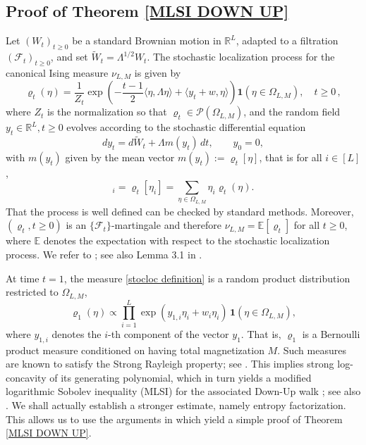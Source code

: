 \documentclass[11pt,reqno]{amsart}
\numberwithin{equation}{section}
\numberwithin{figure}{section}
\renewcommand{\geq}{\ge} %
\newcommand{\1}{\mathds{1}}
\let\O=\Omega
\let\L=\Lambda
\newcommand{\cF}{\ensuremath{\mathcal F}}
\newcommand{\cP}{\ensuremath{\mathcal P}}
\newcommand{\bbE}{{\ensuremath{\mathbb E}} }
\newcommand{\bbR}{{\ensuremath{\mathbb R}} }
\begin{document}
\subsection{Proof of Theorem \ref{MLSI DOWN UP}}
Let \((W_t)_{t \geq 0}\) be a standard Brownian motion in $\bbR^L$,  adapted to a filtration \((\mathcal{F}_t)_{t \geq 0}\), and set $\tilde W_t = \L^{1/2}W_t$. The stochastic localization process for the canonical Ising measure $\nu_{L,M}$ is given by 
\begin{equation}\label{stocloc definition}
    \varrho_t(\eta) =\frac1{Z_t} \exp\left( -\frac{t - 1}{2} \langle \eta, \Lambda \eta \rangle + \langle y_t + w, \eta \rangle \right) \mathbf{1}(\eta \in \Omega_{L,M}),\quad t\ge 0\,,
\end{equation}
where $Z_t$ is the normalization so that $\varrho_t\in\cP(\O_{L,M})$, and  the random field \(y_t \in \mathbb{R}^L, t\ge 0\) evolves according to the stochastic differential equation
\begin{equation}\label{SDE yt}
    dy_t =d\tilde W_t +  \Lambda m(y_t)\,dt, \qquad y_0 = 0,
\end{equation}
with $m(y_t)$ given by the mean vector $m(y_t) := {\varrho_t}[\eta]$, that is for all $i\in[L]$,
\begin{equation}
    [m(y_t)]_i = {\varrho_t}[\eta_i] =\textstyle{ \sum_{\eta\in\O_{L,M}}}\eta_i\varrho_t(\eta).
\end{equation}
That the process is well defined can be checked by standard methods. Moreover,  $(\varrho_t, t\ge 0)$ is an $\{\cF_t\}$-martingale and therefore $\nu_{L,M} = \bbE[\varrho_t]$ for all $t\ge 0$, where $\bbE$ denotes the expectation with respect to the stochastic localization process. We refer to \cite{chen2022localization}; see also Lemma 3.1 in \cite{caputo2025factorizations}. 

At time \(t = 1\), the measure \eqref{stocloc definition} is a random product distribution restricted to \(\Omega_{L,M}\), 
\begin{equation}\label{independent product}
    \varrho_1(\eta) \propto \prod_{i=1}^L \exp\left( y_{1,i}\eta_i + w_i\eta_i \right) \, \mathbf{1}(\eta \in \Omega_{L,M}),
\end{equation}
where $y_{1,i}$ denotes the $i$-th component of the vector $y_1$.
That is, $\varrho_1$ is a Bernoulli product measure conditioned on having total magnetization $M$. Such measures are known to satisfy the Strong Rayleigh property; see \cite{borcea2009negative}. This implies strong log-concavity of its generating polynomial, which in turn yields a modified logarithmic Sobolev inequality (MLSI) for the associated Down-Up walk \cite{CGM}; see also \cite{EntInd22,bauerschmidt2024kawasaki}. We shall actually establish a stronger estimate,  namely entropy factorization. This allows us to use the arguments in \cite{caputo2025factorizations} which yield a simple proof of Theorem \ref{MLSI DOWN UP}. 
\end{document}

